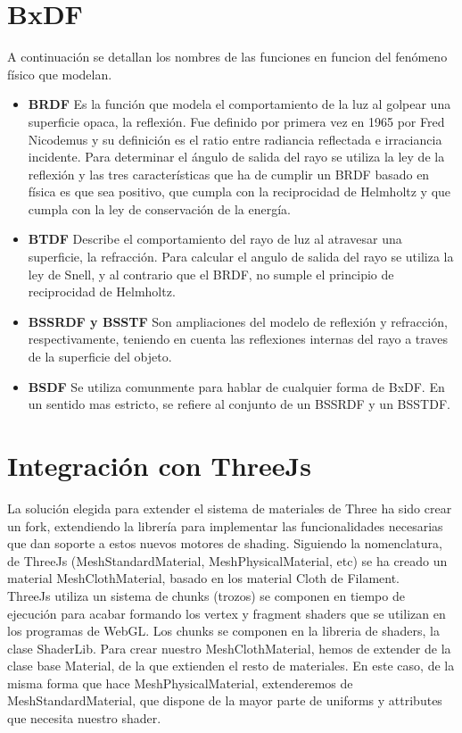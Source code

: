 \section{BxDF}
    \bgroup
    A continuaci\'on se detallan los nombres de las funciones en funcion del fen\'omeno f\'isico que modelan.
    \begin{itemize}
        \item[] \textbf {BRDF} Es la funci\'on que modela el comportamiento de la luz al golpear una superficie opaca, la reflexi\'on. Fue definido por primera vez en 1965 por
        Fred Nicodemus y su definici\'on es el ratio entre radiancia reflectada e irraciancia incidente.
        Para determinar el \'angulo de salida del rayo se utiliza la ley de la reflexi\'on y las tres caracter\'isticas que ha de cumplir un BRDF basado en
        f\'isica es que sea positivo, que cumpla con la reciprocidad de Helmholtz y que cumpla con la ley de conservaci\'on de la energ\'ia.
        \item[] \textbf {BTDF} Describe el comportamiento del rayo de luz al atravesar una superficie, la refracci\'on. Para calcular el angulo de salida del rayo se utiliza la
        ley de Snell, y al contrario que el BRDF, no sumple el principio de reciprocidad de Helmholtz.
        \item[] \textbf {BSSRDF y BSSTF} Son ampliaciones del modelo de reflexi\'on y refracci\'on, respectivamente, teniendo en cuenta las reflexiones internas del rayo a traves de la
        superficie del objeto.
        \item[] \textbf {BSDF} Se utiliza comunmente para hablar de cualquier forma de BxDF. En un sentido mas estricto, se refiere al conjunto de un BSSRDF y un BSSTDF.
    \end{itemize}
    \egroup

    \section{Integraci\'on con ThreeJs}
    La soluci\'on elegida para extender el sistema de materiales de Three ha sido crear un fork, extendiendo la
    librer\'ia para implementar las funcionalidades necesarias que dan soporte a estos nuevos motores de shading.
    Siguiendo la nomenclatura, de ThreeJs (MeshStandardMaterial, MeshPhysicalMaterial, etc) se ha creado un material
    MeshClothMaterial, basado en los material Cloth de Filament.\\
    ThreeJs utiliza un sistema de chunks (trozos) se componen en tiempo de ejecuci\'on para acabar formando los vertex
    y fragment shaders que se utilizan en los programas de WebGL. Los chunks se componen en la libreria de shaders, la
    clase ShaderLib.
    Para crear nuestro MeshClothMaterial, hemos de extender de la clase base Material, de la que extienden el resto de
    materiales. En este caso, de la misma forma que hace MeshPhysicalMaterial, extenderemos de MeshStandardMaterial,
    que dispone de la mayor parte de uniforms y attributes que necesita nuestro shader.\\

